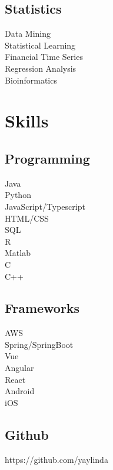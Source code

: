 \documentclass[letterpaper]{deedy-resume-openfont} %
\begin{document}
\begin{minipage}[t]{0.29\textwidth}
\sectionsep %

\subsection{Statistics}
\textbullet{} Data Mining\\
\textbullet{} Statistical Learning\\
\textbullet{} Financial Time Series\\
\textbullet{} Regression Analysis\\
\textbullet{} Bioinformatics\\

\sectionsep %


\section{Skills}

\subsection{Programming}

\textbullet{} Java\\
\textbullet{} Python\\
\textbullet{} JavaScript/Typescript\\
\textbullet{} HTML/CSS\\
\textbullet{} SQL\\
\textbullet{} R\\
\textbullet{} Matlab\\
\textbullet{} C\\
\textbullet{} C++

\sectionsep %

\subsection{Frameworks}
\textbullet{} AWS\\
\textbullet{} Spring/SpringBoot\\
\textbullet{} Vue\\
\textbullet{} Angular\\
\textbullet{} React\\
\textbullet{} Android\\
\textbullet{} iOS\\

\sectionsep %

\subsection{Github}
\textbullet{} https://github.com/yaylinda


\end{minipage} %
\end{document}
